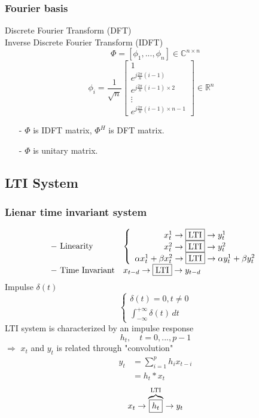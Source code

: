 \begin{multicols}{2}
\subsubsection{Fourier basis}
Discrete Fourier Transform (DFT) \\
Inverse Discrete Fourier Transform (IDFT)
\[
    \Phi = [\phi_1,...,\phi_n]\in\mathbb{C}^{n\times n}
\]
\[
    \phi_i = \frac{1}{\sqrt{n}}
    \left[\begin{array}{l}
        1 \\
        e^{j\frac{2\pi}{n}(i-1)} \\
        e^{j\frac{2\pi}{n}(i-1)\times 2} \\
        \vdots \\
        e^{j\frac{2\pi}{n}(i-1)\times {n-1}}
    \end{array}
    \right]
    \in\mathbb{R}^{n} \quad
\]
\begin{itemize}
    \item [-] $\Phi$ is IDFT matrix, $\Phi^H$ is DFT matrix.
    \item [-] $\Phi$ is unitary matrix.
\end{itemize}

\subsection{LTI System}
\subsubsection{Lienar time invariant system}
\[
    \begin{array}{ll}
        -\text{ \rm Linearity} & 
        \left\{\begin{array}{c}
            x_t^1\to \boxed{\text{\rm LTI}} \to y_t^1 \\
            x_t^2 \to \boxed{\text{\rm LTI}} \to y_t^2 \\
            \alpha x_t^1 + \beta x_t^2\to \boxed{\text{\rm LTI}} \to \alpha y_t^1 +\beta y_t^2
        \end{array}
        \right.
        \\
        -\text{ \rm Time Invariant} & x_{t-d}\to \boxed{\text{\rm LTI}} \to y_{t-d}
    \end{array}
\]
Impulse $\delta(t)$
\[
    \left\{\begin{array}{l}
        \delta(t)=0,t\neq 0 \\
        \int_{-\infty}^{+\infty}\delta(t) \,dt 
    \end{array}\right.
\]
LTI system is characterized by an impulse response 
\[
    h_t,\quad t=0,...,p-1
\]
$\Longrightarrow$ $x_t$ and $y_t$ is related through "convolution"
\[
    \begin{array}{ll}
        y_t&=\sum_{i=1}^p {h_i x_{t-i}} \\
        &=h_t\ast x_t
    \end{array}
\]
\[
    x_t\to\overbrace{\boxed{h_t}}^{\text{\rm LTI}}\to y_t
\]

\end{multicols}
